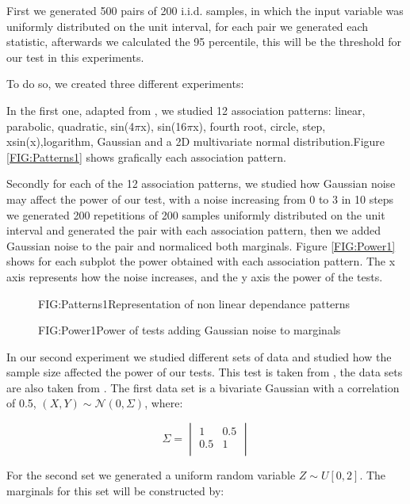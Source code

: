 First we generated 500 pairs  of 200 i.i.d. samples, in which the input variable was uniformly distributed on the unit interval, for each pair we generated each statistic, afterwards we calculated the 95 percentile, this will be the threshold for our test in this experiments.

To do so, we created three different experiments:

\label{exp:1}In the first one, adapted from \cite{RDC1}, we studied 12 association patterns: linear, parabolic, quadratic, sin(4$\pi$x), sin(16$\pi$x), fourth root, circle, step, xsin(x),logarithm, Gaussian and a 2D multivariate normal distribution.Figure \ref{FIG:Patterns1} shows grafically each association pattern.

Secondly for each of the 12 association patterns, we studied how Gaussian noise may affect the power of our test, with a noise increasing from 0 to 3 in 10 steps we generated 200 repetitions of 200 samples uniformly distributed on the unit interval and generated the pair with each association pattern, then we added Gaussian noise to the pair and normaliced both marginals.
Figure \ref{FIG:Power1} shows for each subplot the power obtained with each association pattern. The x axis represents how the noise increases, and the y axis the power of the tests.
\FloatBarrier
\begin{figure}[Non linear dependance patterns example 1]{FIG:Patterns1}{Representation of non linear dependance patterns}
\end{figure}

\begin{figure}[Power of tests uniform marginals same size adding noise]{FIG:Power1}{Power of tests adding Gaussian noise to marginals}
\end{figure}
\FloatBarrier
In our second experiment we studied different sets of data and studied how the sample size affected the power of our tests. This test is taken from \cite{Size}, the data sets are also taken from \cite{Size}.
The first data set is a bivariate Gaussian with a correlation of 0.5, $(X,Y)\sim \mathcal{N}(0,\Sigma)$, where:

$$\Sigma =
\begin{vmatrix}
1&0.5\\
0.5&1\\
\end{vmatrix}
$$

For the second set we generated a uniform random variable $Z\sim U[0,2]$. The marginals for this set will be constructed by:

